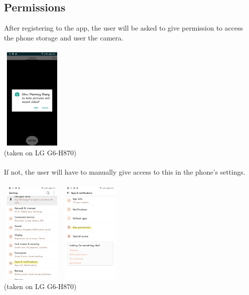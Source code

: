 \documentclass{article}
\begin{document}
\subsection{Permissions}
After registering to the app, the user  will be asked to give permission to access the phone storage and user the camera.
\\\\
\includegraphics[width=3cm, height=5cm]{permissions}\\
{\small(taken on LG G6-H870)}
\\\\
If not, the user will have to manually give access to this in the phone's settings.
\\\\
\includegraphics[width=3cm, height=5cm]{permissions2}\quad 
\includegraphics[width=3cm, height=5cm]{permissions3}\\
{\small(taken on LG G6-H870)}
\end{document}
